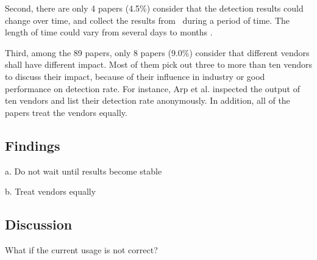 Second, there are only 4 papers (4.5\%) consider that the detection results could change over time, and collect the results from \vt\ during a period of time. 
The length of time could vary from several days \cite{kharraz2016unveil, rajab2013camp} to months \cite{neeles, wressnegger2017looking}. 

Third, among the 89 papers, only 8 papers (9.0\%) consider that different vendors shall have different impact. 
Most of them pick out three to more than ten vendors to discuss their impact, because of their influence in industry or good performance on detection rate. 
For instance, Arp et al. \cite{arp2014drebin} inspected the output of ten vendors and list their detection rate anonymously. 
In addition, all of the papers treat the vendors equally. %
\subsection{Findings}
a. Do not wait until results become stable

b. Treat vendors equally

\subsection{Discussion}
What if the current usage is not correct? 
